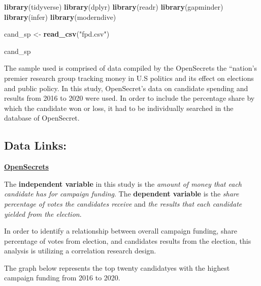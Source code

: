 \documentclass[
]{article}
\newenvironment{Shaded}{\begin{snugshade}}{\end{snugshade}}
\newcommand{\FunctionTok}[1]{\textcolor[rgb]{0.13,0.29,0.53}{\textbf{#1}}}
\newcommand{\NormalTok}[1]{#1}
\newcommand{\OtherTok}[1]{\textcolor[rgb]{0.56,0.35,0.01}{#1}}
\newcommand{\StringTok}[1]{\textcolor[rgb]{0.31,0.60,0.02}{#1}}
\begin{document}
\begin{Shaded}
\begin{Highlighting}[]
\FunctionTok{library}\NormalTok{(tidyverse)}
\FunctionTok{library}\NormalTok{(dplyr)}
\FunctionTok{library}\NormalTok{(readr)}
\FunctionTok{library}\NormalTok{(gapminder)}
\FunctionTok{library}\NormalTok{(infer)}
\FunctionTok{library}\NormalTok{(moderndive)}


\NormalTok{cand\_sp }\OtherTok{\textless{}{-}} \FunctionTok{read\_csv}\NormalTok{(}\StringTok{"fpd.csv"}\NormalTok{)}

\NormalTok{cand\_sp}
\end{Highlighting}
\end{Shaded}

The sample used is comprised of data compiled by the OpenSecrets the
``nation's premier research group tracking money in U.S politics and its
effect on elections and public policy. In this study, OpenSecret's data
on candidate spending and results from 2016 to 2020 were used. In order
to include the percentage share by which the candidate won or loss, it
had to be individually searched in the database of OpenSecret.

\hypertarget{data-links}{%
\subsection{Data Links:}\label{data-links}}

\href{https://www.opensecrets.org/elections-overview/top-self-funders?cycle=2016}{\textbf{OpenSecrets}}

The \textbf{independent variable} in this study is the \emph{amount of
money that each candidate has for campaign funding}. The
\textbf{dependent variable} is the \emph{share percentage of votes the
candidates receive} and \emph{the results that each candidate yielded
from the election}.

In order to identify a relationship between overall campaign funding,
share percentage of votes from election, and candidates results from the
election, this analysis is utilizing a correlation research design.

The graph below represents the top twenty candidatyes with the highest
campaign funding from 2016 to 2020.
\end{document}
